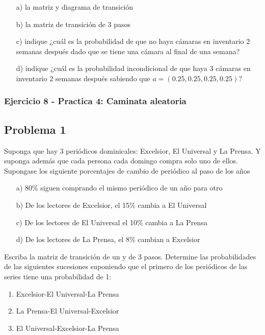 \documentclass{article}
\begin{document}
\begin{itemize}
    \item[a)] la matriz y diagrama de transición
    \item[b)] la matriz de transición de 3 pasos
    \item[c)] indique ¿cuál es la probabilidad de que no haya cámaras en inventario 2 semanas después dado que se tiene una cámara al final de una semana?
    \item[d)] indique ¿cuál es la probabilidad incondicional de que haya 3 cámaras en inventario 2 semanas después sabiendo que \( a=(0.25, 0.25, 0.25, 0.25) \)?
\end{itemize}

\subsubsection{Ejercicio 8 - Practica 4: Caminata aleatoria}

\subsection*{Problema 1}

Suponga que hay 3 periódicos dominicales: Excelsior, El Universal y La Prensa.
Y suponga además que cada persona cada domingo compra solo uno de ellos. Supongase los siguiente porcentajes de cambio de periódico al paso de los años

\begin{itemize}
    \item[a)] 80\% siguen comprando el mismo periódico de un año para otro
    \item[b)] De los lectores de Excelsior, el 15\% cambia a El Universal
    \item[c)] De los lectores de El Universal el 10\% cambia a La Prensa
    \item[d)] De los lectores de La Prensa, el 8\% cambian a Excelsior
\end{itemize}

Escriba la matriz de transición de un y de 3 pasos. Determine las probabilidades de las siguientes sucesiones suponiendo que el primero de los periódicos de las series tiene una probabilidad de 1:

\begin{enumerate}
    \item Excelsior-El Universal-La Prensa
    \item La Prensa-El Universal-Excelsior
    \item El Universal-Excelsior-La Prensa
\end{enumerate}
\end{document}
